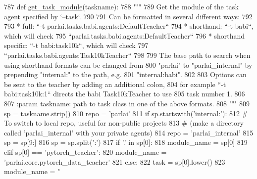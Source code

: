 \begin{DoxyCode}
787 \textcolor{keyword}{def }\hyperlink{namespaceparlai_1_1core_1_1agents_a530b987b67a802a8e9c5fa3c24ae942f}{get\_task\_module}(taskname):
788     \textcolor{stringliteral}{"""}
789 \textcolor{stringliteral}{    Get the module of the task agent specified by `--task`.}
790 \textcolor{stringliteral}{}
791 \textcolor{stringliteral}{    Can be formatted in several different ways:}
792 \textcolor{stringliteral}{}
793 \textcolor{stringliteral}{    * full: ``-t parlai.tasks.babi.agents:DefaultTeacher``}
794 \textcolor{stringliteral}{    * shorthand: ``-t babi``, which will check}
795 \textcolor{stringliteral}{        ``parlai.tasks.babi.agents:DefaultTeacher``}
796 \textcolor{stringliteral}{    * shorthand specific: ``-t babi:task10k``, which will check}
797 \textcolor{stringliteral}{        ``parlai.tasks.babi.agents:Task10kTeacher``}
798 \textcolor{stringliteral}{}
799 \textcolor{stringliteral}{    The base path to search when using shorthand formats can be changed from}
800 \textcolor{stringliteral}{    "parlai" to "parlai\_internal" by prepending "internal:" to the path, e.g.}
801 \textcolor{stringliteral}{    "internal:babi".}
802 \textcolor{stringliteral}{}
803 \textcolor{stringliteral}{    Options can be sent to the teacher by adding an additional colon,}
804 \textcolor{stringliteral}{    for example ``-t babi:task10k:1`` directs the babi Task10kTeacher to use}
805 \textcolor{stringliteral}{    task number 1.}
806 \textcolor{stringliteral}{}
807 \textcolor{stringliteral}{    :param taskname: path to task class in one of the above formats.}
808 \textcolor{stringliteral}{    """}
809     sp = taskname.strip()
810     repo = \textcolor{stringliteral}{'parlai'}
811     \textcolor{keywordflow}{if} sp.startswith(\textcolor{stringliteral}{'internal:'}):
812         \textcolor{comment}{# To switch to local repo, useful for non-public projects}
813         \textcolor{comment}{# (make a directory called 'parlai\_internal' with your private agents)}
814         repo = \textcolor{stringliteral}{'parlai\_internal'}
815         sp = sp[9:]
816     sp = sp.split(\textcolor{stringliteral}{':'})
817     \textcolor{keywordflow}{if} \textcolor{stringliteral}{'.'} \textcolor{keywordflow}{in} sp[0]:
818         module\_name = sp[0]
819     \textcolor{keywordflow}{elif} sp[0] == \textcolor{stringliteral}{'pytorch\_teacher'}:
820         module\_name = \textcolor{stringliteral}{'parlai.core.pytorch\_data\_teacher'}
821     \textcolor{keywordflow}{else}:
822         task = sp[0].lower()
823         module\_name = \textcolor{stringliteral}{"%
}
\end{DoxyCode}
